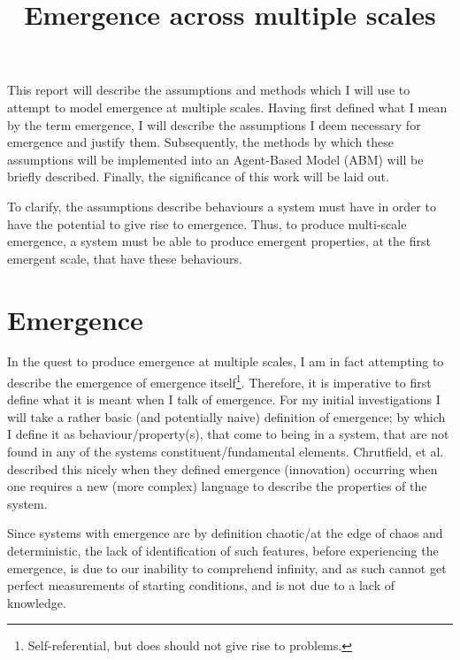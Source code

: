 \documentclass{article}
\title{Emergence across multiple scales}
\author{}
\date{}
\begin{document}
\maketitle
\vspace{-13mm}


This report will describe the assumptions and methods which I will use to attempt to model emergence at multiple scales. Having first defined what I mean by the term emergence, I will describe the assumptions I deem necessary for emergence and justify them. Subsequently, the methods by which these assumptions will be implemented into an Agent-Based Model (ABM) will be briefly described. Finally, the significance of this work will be laid out.

To clarify, the assumptions describe behaviours a system must have in order to have the potential to give rise to emergence. Thus, to produce multi-scale emergence, a system must be able to produce emergent properties, at the first emergent scale, that have these behaviours.


\section{Emergence}

In the quest to produce emergence at multiple scales, I am in fact attempting to describe the emergence of emergence itself\footnote{Self-referential, but does should not give rise to problems.}. Therefore, it is imperative to first define what it is meant when I talk of emergence. For my initial investigations I will take a rather basic (and potentially naive) definition of emergence; by which I define it as behaviour/property(s), that come to being in a system, that are not found in any of the systems constituent/fundamental elements. Chrutfield, et al. described this nicely when they defined emergence (innovation) occurring when one requires a new (more complex) language to describe the properties of the system. 

Since systems with emergence are by definition chaotic/at the edge of chaos and deterministic, the lack of identification of such features, before experiencing the emergence, is due to our inability to comprehend infinity, and as such cannot get perfect measurements of starting conditions, and is not due to a lack of knowledge.
\end{document}
